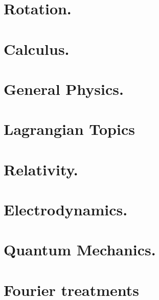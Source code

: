 \documentclass[12pt,leqno]{book}
\begin{document}
\part{Rotation.}





\part{Calculus.}






\part{General Physics.}







\part{Lagrangian Topics}




\part{Relativity.}







\part{Electrodynamics.}









\part{Quantum Mechanics.}





\part{Fourier treatments}









\end{document}
